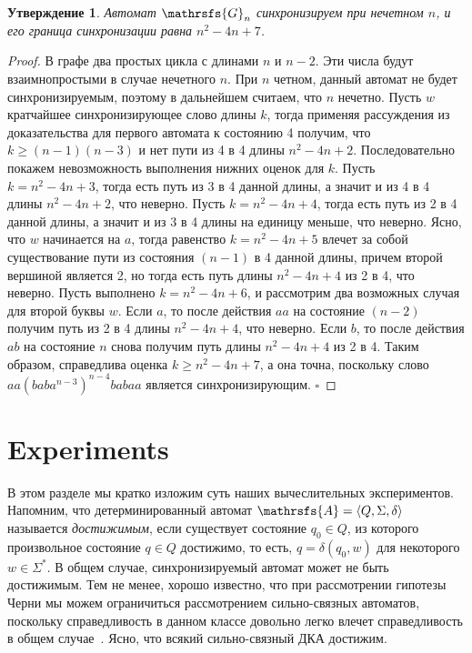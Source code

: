 \documentclass[11pt]{article}
\newtheorem{theorem}{Утверждение}
\begin{document}
\begin{theorem}
Автомат $\mathrsfs{G}_n$ синхронизируем при нечетном $n$, и его граница синхронизации равна $n^2 - 4n + 7$.
\end{theorem}

\begin{proof}
В графе два простых цикла с длинами $n$ и $n - 2$. Эти числа будут взаимнопростыми в случае нечетного $n$. При $n$ четном, данный автомат не будет 
синхронизируемым, поэтому в дальнейшем считаем, что $n$ нечетно. Пусть $w$ кратчайшее синхронизирующее слово длины $k$, тогда применяя рассуждения из доказательства
для первого автомата к состоянию 4 получим, что $k \ge (n - 1)(n - 3)$ и нет пути из 4 в 4 длины $n^2 - 4n + 2$. Последовательно покажем невозможность выполнения 
нижних оценок для $k$. Пусть $k = n^2 - 4n + 3$, тогда есть путь из 3 в 4 данной длины, а значит и из 4 в 4 длины $n^2 - 4n + 2$, что неверно.
Пусть $k = n^2 - 4n + 4$, тогда есть путь из 2 в 4 данной длины, а значит и из 3 в 4 длины на единицу меньше, что неверно. Ясно, что $w$ начинается на $a$, тогда
равенство $k = n^2 - 4n + 5$ влечет за собой существование пути из состояния $(n - 1)$ в 4 данной длины, причем второй вершиной является 2, но тогда есть путь 
длины $n^2 - 4n + 4$
из 2 в 4, что неверно. Пусть выполнено $k = n^2 - 4n + 6$, и рассмотрим два возможных случая для второй буквы $w$. Если $a$, то после действия $aa$ на 
состояние $(n - 2)$ получим путь из 2 в 4 длины $n ^2 - 4n + 4$, что неверно. Если $b$, то после действия $ab$ на состояние $n$ снова получим путь длины $n^2 - 4n + 4$
из 2 в 4. Таким образом, справедлива оценка $k \ge n^2 - 4n + 7$, а она точна, поскольку слово $aa(baba^{n - 3})^{n - 4}babaa$ является синхронизирующим.
$\square$
\end{proof}

\section{Experiments}
\label{experiments}
В этом разделе мы кратко изложим суть наших вычеслительных экспериментов.
Напомним, что детерминированный автомат $\mathrsfs{A}=\langle Q,\Sigma,\delta\rangle$ называется
\emph{достижимым}, если существует состояние $q_0\in Q$, из которого произвольное состояние 
$q\in Q$ достижимо, то есть, $q=\delta(q_0,w)$ для некоторого $w\in\Sigma^*$. В общем случае,
синхронизируемый автомат может не быть достижимым. Тем не менее, хорошо известно,
что при рассмотрении гипотезы Черни мы можем ограничиться рассмотрением сильно-связных автоматов,
поскольку справедливость в данном классе довольно легко влечет справедливость в общем
случае~\cite{Pi78}. Ясно, что всякий сильно-связный ДКА достижим.
\end{document}
